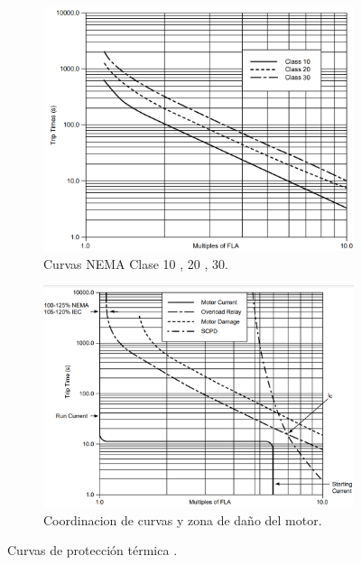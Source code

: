 \begin{figure}
	\centering
	\begin{subfigure}[b]{0.48\textwidth}
		\centering
	\includegraphics[width=\textwidth]{fig/CurvasClass}
	\caption{Curvas NEMA Clase 10 , 20 , 30.}
	\label{fig:curvasclass}
	\end{subfigure}
	\hfill
	\begin{subfigure}[b]{0.5\textwidth}
		\centering
		\includegraphics[width=\textwidth]{fig/Cordinación}
		\caption{Coordinacion de curvas y zona de daño del motor.}
		\label{fig:cordinacion}
	\end{subfigure}
	\caption{Curvas de protección térmica \cite{Scheneider}.}
\end{figure}


